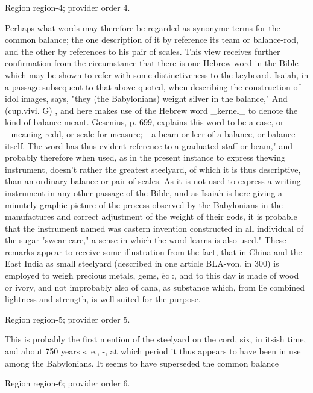 \documentclass[11pt]{article}
\begin{document}
{\scriptsize\color{gray} Region region-4; provider order 4.\par}
\medskip

Perhaps what words may therefore be regarded as synonyme terms for the common balance; the one description of it by reference its team or balance-rod, and the other by references to his pair of scales. This view receives further confirmation from the circumstance that there is one Hebrew word in the Bible which may be shown to refer with some distinctiveness to the keyboard. Isaiah, in a passage subsequent to that above quoted, when describing the construction of idol images, says, "they (the Babylonians) weight silver in the balance," And (cup.vivi. G) , and here makes use of the Hebrew word \_kernel\_ to denote the kind of balance meant. Gesenius, p. 699, explains this word to be a case, or \_meaning redd, or scale for measure;\_ a beam or leer of a balance, or balance itself. The word has thus evident reference to a graduated staff or beam," and probably therefore when used, as in the present instance to express thewing instrument, doesn't rather the greatest steelyard, of which it is thus descriptive, than an ordinary balance or pair of scales. As it is not used to express a writing instrument in any other passage of the Bible, and as Isaiah is here giving a minutely graphic picture of the process observed by the Babylonians in the manufactures and correct adjustment of the weight of their gods, it is probable that the instrument named was castern invention constructed in all individual of the sugar "swear care," a sense in which the word learns is also used." These remarks appear to receive some illustration from the fact, that in China and the East India as small steelyard (described in one article BLA-von, in 300) is employed to weigh precious metals, gems, èc :, and to this day is made of wood or ivory, and not improbably also of cana, as substance which, from lie combined lightness and strength, is well suited for the purpose.
\par

{\scriptsize\color{gray} Region region-5; provider order 5.\par}
\medskip

This is probably the first mention of the steelyard on the cord, six, in itsish time, and about 750 years s. e., -, at which period it thus appears to have been in use among the Babylonians. It seems to have superseded the common balance
\par

{\scriptsize\color{gray} Region region-6; provider order 6.\par}
\medskip
\end{document}
